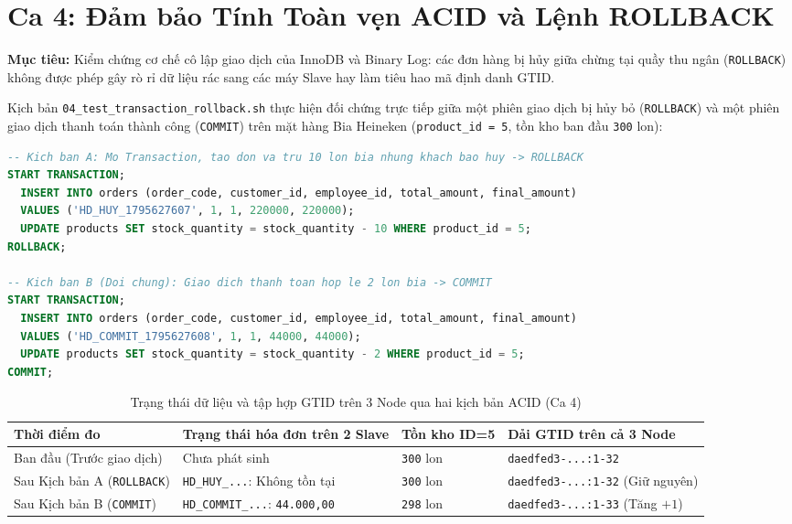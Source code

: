 \documentclass[12pt,a4paper]{report}
\begin{document}
\section{Ca 4: Đảm bảo Tính Toàn vẹn ACID và Lệnh ROLLBACK}
\textbf{Mục tiêu:} Kiểm chứng cơ chế cô lập giao dịch của InnoDB và Binary Log: các đơn hàng bị hủy giữa chừng tại quầy thu ngân (\texttt{ROLLBACK}) không được phép gây rò rỉ dữ liệu rác sang các máy Slave hay làm tiêu hao mã định danh GTID.

Kịch bản \texttt{04\_test\_transaction\_rollback.sh} thực hiện đối chứng trực tiếp giữa một phiên giao dịch bị hủy bỏ (\texttt{ROLLBACK}) và một phiên giao dịch thanh toán thành công (\texttt{COMMIT}) trên mặt hàng Bia Heineken (\texttt{product\_id = 5}, tồn kho ban đầu \texttt{300} lon):

\begin{lstlisting}[language=SQL, label={lst:ca4_acid}, caption={Đối chứng giao dịch ROLLBACK và giao dịch COMMIT trên Master (Ca 4)}]
-- Kich ban A: Mo Transaction, tao don va tru 10 lon bia nhung khach bao huy -> ROLLBACK
START TRANSACTION;
  INSERT INTO orders (order_code, customer_id, employee_id, total_amount, final_amount)
  VALUES ('HD_HUY_1795627607', 1, 1, 220000, 220000);
  UPDATE products SET stock_quantity = stock_quantity - 10 WHERE product_id = 5;
ROLLBACK;

-- Kich ban B (Doi chung): Giao dich thanh toan hop le 2 lon bia -> COMMIT
START TRANSACTION;
  INSERT INTO orders (order_code, customer_id, employee_id, total_amount, final_amount)
  VALUES ('HD_COMMIT_1795627608', 1, 1, 44000, 44000);
  UPDATE products SET stock_quantity = stock_quantity - 2 WHERE product_id = 5;
COMMIT;
\end{lstlisting}

\begin{table}[H]
\centering
\footnotesize
\caption{Trạng thái dữ liệu và tập hợp GTID trên 3 Node qua hai kịch bản ACID (Ca 4)}
\label{tab:ca4_results}
\vspace{0.15cm}
\begin{tabularx}{\textwidth}{L{3.5cm} L{3.6cm} L{2.4cm} Y}
\toprule
\textbf{Thời điểm đo} & \textbf{Trạng thái hóa đơn trên 2 Slave} & \textbf{Tồn kho ID=5} & \textbf{Dải GTID trên cả 3 Node} \\
\midrule
Ban đầu (Trước giao dịch) & Chưa phát sinh & \texttt{300} lon & \texttt{daedfed3-...:1-32} \\
Sau Kịch bản A (\texttt{ROLLBACK}) & \texttt{HD\_HUY\_...}: Không tồn tại & \texttt{300} lon & \texttt{daedfed3-...:1-32} (Giữ nguyên) \\
Sau Kịch bản B (\texttt{COMMIT}) & \texttt{HD\_COMMIT\_...}: \texttt{44.000,00} & \texttt{298} lon & \texttt{daedfed3-...:1-33} (Tăng $+1$) \\
\bottomrule
\end{tabularx}
\end{table}
\end{document}
